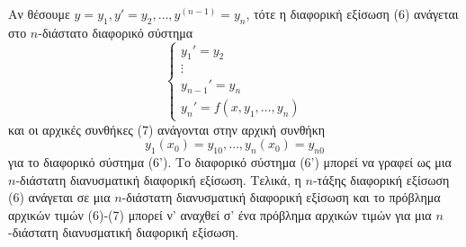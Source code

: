 \documentclass[a4paper,twoside,11pt]{book}
\begin{document}
Αν θέσουμε $y=y_1, y'=y_2, \dots, y^{(n-1)}=y_n$, τότε η διαφορική εξίσωση (6) ανάγεται στο $n$-διάστατο διαφορικό σύστημα
\begin{equation*} \label{eq:6prime}
    \begin{cases}
        y_1' = y_2 \\
        \vdots \\
        y_{n-1}' = y_n \\
        y_n' = f(x,y_1, \dots, y_n)
    \end{cases} \tag{6'}
\end{equation*}
και οι αρχικές συνθήκες (7) ανάγονται στην αρχική συνθήκη
\begin{equation*} \label{eq:7prime}
    y_1(x_0)=y_{10}, \dots, y_n(x_0)=y_{n0} \tag{7'}
\end{equation*}
για το διαφορικό σύστημα (6'). Το διαφορικό σύστημα (6') μπορεί να γραφεί ως μια $n$-διάστατη διανυσματική διαφορική εξίσωση. Τελικά, η $n$-τάξης διαφορική εξίσωση (6) ανάγεται σε μια $n$-διάστατη διανυσματική διαφορική εξίσωση και το πρόβλημα αρχικών τιμών (6)-(7) μπορεί ν' αναχθεί σ' ένα πρόβλημα αρχικών τιμών για μια $n$-διάστατη διανυσματική διαφορική εξίσωση.
\end{document}

